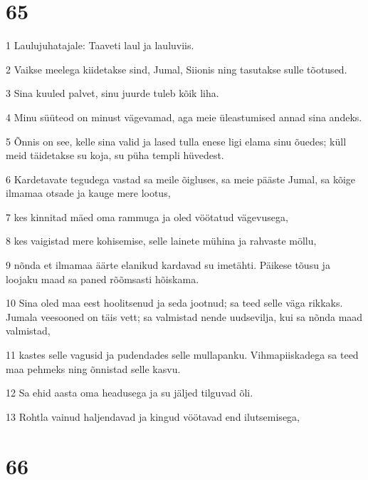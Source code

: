 \chapter{65}

\par 1 Laulujuhatajale: Taaveti laul ja lauluviis.
\par 2 Vaikse meelega kiidetakse sind, Jumal, Siionis ning tasutakse sulle tõotused.
\par 3 Sina kuuled palvet, sinu juurde tuleb kõik liha.
\par 4 Minu süüteod on minust vägevamad, aga meie üleastumised annad sina andeks.
\par 5 Õnnis on see, kelle sina valid ja lased tulla enese ligi elama sinu õuedes; küll meid täidetakse su koja, su püha templi hüvedest.
\par 6 Kardetavate tegudega vastad sa meile õigluses, sa meie pääste Jumal, sa kõige ilmamaa otsade ja kauge mere lootus,
\par 7 kes kinnitad mäed oma rammuga ja oled vöötatud vägevusega,
\par 8 kes vaigistad mere kohisemise, selle lainete mühina ja rahvaste möllu,
\par 9 nõnda et ilmamaa äärte elanikud kardavad su imetähti. Päikese tõusu ja loojaku maad sa paned rõõmsasti hõiskama.
\par 10 Sina oled maa eest hoolitsenud ja seda jootnud; sa teed selle väga rikkaks. Jumala veesooned on täis vett; sa valmistad nende uudsevilja, kui sa nõnda maad valmistad,
\par 11 kastes selle vagusid ja pudendades selle mullapanku. Vihmapiiskadega sa teed maa pehmeks ning õnnistad selle kasvu.
\par 12 Sa ehid aasta oma headusega ja su jäljed tilguvad õli.
\par 13 Rohtla vainud haljendavad ja kingud vöötavad end ilutsemisega,

\chapter{66}

